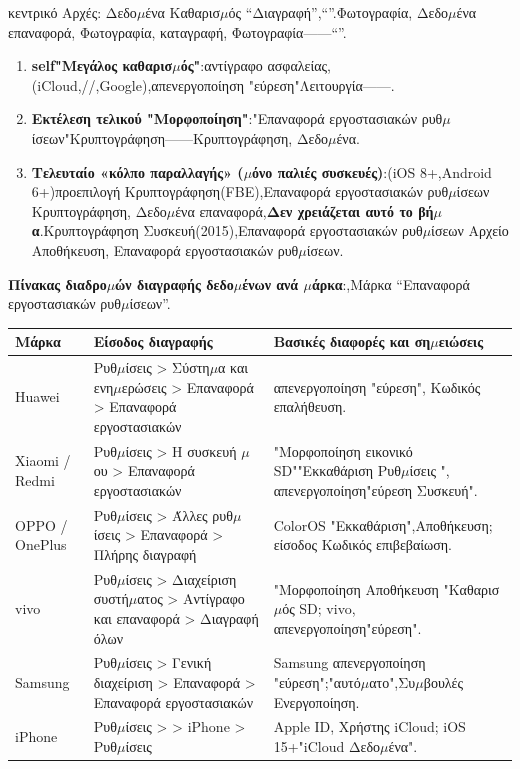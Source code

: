 


κεντρικό Αρχές: Δεδο$\mu$ένα Καθαρισ$\mu$ός “Διαγραφή”,“”.Φωτογραφία, Δεδο$\mu$ένα επαναφορά, Φωτογραφία, καταγραφή, Φωτογραφία——“”.

\begin{enumerate}
  \item \textbf{self"Μεγάλος καθαρισ$\mu$ός"}:αντίγραφο ασφαλείας,(iCloud,//,Google),απενεργοποίηση "εύρεση"Λειτουργία——.
  \item \textbf{Εκτέλεση τελικού "Μορφοποίηση"}:"Επαναφορά εργοστασιακών ρυθ$\mu$ίσεων"Κρυπτογράφηση——Κρυπτογράφηση, Δεδο$\mu$ένα.
  \item \textbf{Τελευταίο «κόλπο παραλλαγής» ($\mu$όνο παλιές συσκευές)}:(iOS 8+,Android 6+)προεπιλογή Κρυπτογράφηση(FBE),Επαναφορά εργοστασιακών ρυθ$\mu$ίσεων Κρυπτογράφηση, Δεδο$\mu$ένα επαναφορά,\textbf{Δεν χρειάζεται αυτό το βή$\mu$α}.Κρυπτογράφηση Συσκευή(2015),Επαναφορά εργοστασιακών ρυθ$\mu$ίσεων Αρχείο Αποθήκευση, Επαναφορά εργοστασιακών ρυθ$\mu$ίσεων.
\end{enumerate}

\textbf{Πίνακας διαδρο$\mu$ών διαγραφής δεδο$\mu$ένων ανά $\mu$άρκα}:,Μάρκα “Επαναφορά εργοστασιακών ρυθ$\mu$ίσεων”.

\begin{center}
\begin{tabularx}{\linewidth}{|X|X|X|}
\hline
\textbf{Μάρκα} & \textbf{Είσοδος διαγραφής} & \textbf{Βασικές διαφορές και ση$\mu$ειώσεις} \tabularnewline
\hline
Huawei & Ρυθ$\mu$ίσεις > Σύστη$\mu$α και ενη$\mu$ερώσεις > Επαναφορά > Επαναφορά εργοστασιακών & απενεργοποίηση "εύρεση", Κωδικός επαλήθευση. \tabularnewline
Xiaomi / Redmi & Ρυθ$\mu$ίσεις > Η συσκευή $\mu$ου > Επαναφορά εργοστασιακών & "Μορφοποίηση εικονικό SD""Εκκαθάριση Ρυθ$\mu$ίσεις ", απενεργοποίηση"εύρεση Συσκευή". \tabularnewline
OPPO / OnePlus & Ρυθ$\mu$ίσεις > Άλλες ρυθ$\mu$ίσεις > Επαναφορά > Πλήρης διαγραφή & ColorOS "Εκκαθάριση",Αποθήκευση; είσοδος Κωδικός επιβεβαίωση. \tabularnewline
vivo & Ρυθ$\mu$ίσεις > Διαχείριση συστή$\mu$ατος > Αντίγραφο και επαναφορά > Διαγραφή όλων & "Μορφοποίηση Αποθήκευση "Καθαρισ$\mu$ός SD; vivo, απενεργοποίηση"εύρεση". \tabularnewline
Samsung & Ρυθ$\mu$ίσεις > Γενική διαχείριση > Επαναφορά > Επαναφορά εργοστασιακών & Samsung απενεργοποίηση "εύρεση";"αυτό$\mu$ατο",Συ$\mu$βουλές Ενεργοποίηση. \tabularnewline
iPhone & Ρυθ$\mu$ίσεις > > iPhone > Ρυθ$\mu$ίσεις & Apple ID, Χρήστης iCloud; iOS 15+"iCloud Δεδο$\mu$ένα". \tabularnewline
\hline
\end{tabularx}
\end{center}

